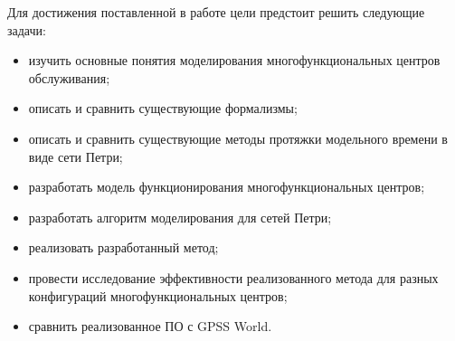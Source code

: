 Для достижения поставленной в работе цели предстоит решить следующие задачи:
\begin{itemize}[label=---]
	\item изучить основные понятия моделирования многофункциональных центров обслуживания;
	\item описать и сравнить существующие формализмы;
	\item описать и сравнить существующие методы протяжки модельного времени в виде сети Петри;
	\item разработать модель функционирования многофункциональных центров;
	\item разработать алгоритм моделирования для сетей Петри;
	\item реализовать разработанный метод; 
	\item провести исследование эффективности реализованного метода для разных конфигураций многофункциональных центров;
	\item сравнить реализованное ПО с GPSS World.
\end{itemize}
